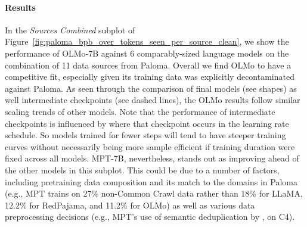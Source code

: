 \documentclass[11pt]{article}
\newcommand{\olmo}{OLMo\xspace}
\newcommand{\model}{OLMo-7B\xspace}
\begin{document}
\paragraph{Results} In the \textit{Sources Combined} subplot of Figure~\ref{fig:paloma_bpb_over_tokens_seen_per_source_clean}, we show the performance of \model against 6 comparably-sized language models on the combination of 11 data sources from Paloma. Overall we find \olmo to have a competitive fit, especially given its training data was explicitly decontaminated against Paloma. As seen through the comparison of final models (see shapes) as well intermediate checkpoints (see dashed lines),  the \olmo results follow similar scaling trends of other models. Note that the performance of intermediate checkpoints is influenced by where that checkpoint occurs in the learning rate schedule. So models trained for fewer steps will tend to have steeper training curves without necessarily being more sample efficient if training duration were fixed across all models. MPT-7B, nevertheless, stands out as improving ahead of the other models in this subplot. This could be due to a number of factors, including pretraining data composition and its match to the domains in Paloma (e.g., MPT trains on 27\%  non-Common Crawl data rather than 18\% for LLaMA, 12.2\% for RedPajama, and 11.2\% for \olmo) as well as various data preprocessing decisions (e.g., MPT's use of semantic deduplication by \citealp{abbas2023semdedup}, on C4).





\end{document}
